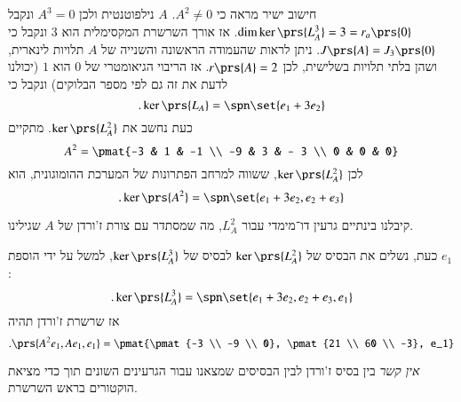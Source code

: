 \documentclass[a4paper,10pt,oneside,openany]{article}
\begin{document}
\begin{solution}
חישוב ישיר מראה כי
$A^2 \neq 0$.
$A$
נילפוטנטית ולכן
$A^3 = 0$
ונקבל
$\dim \ker \prs{L_A^3} = 3 = r_a\prs{0}$.
אז אורך השרשרת המקסימלית הוא
$3$
ונקבל כי
$J\prs{A} = J_3\prs{0}$.
ניתן לראות שהעמודה הראשונה והשנייה של
$A$
תלויות לינארית, ושהן בלתי תלויות בשלישית, לכן
$r\prs{A} = 2$.
אז הריבוי הגיאומטרי של
$0$
הוא
$1$
(יכולנו לדעת את זה גם לפי מספר הבלוקים) ונקבל כי
\[\text{.} \ker\prs{L_A} = \spn\set{e_1 + 3 e_2}\]
כעת נחשב את
$\ker\prs{L_A^2}$.
מתקיים
\[A^2 = \pmat{-3 & 1 & -1 \\ -9 & 3 & - 3 \\ 0 & 0 & 0}\]
לכן
$\ker\prs{L_A^2}$,
ששווה למרחב הפתרונות של המערכת ההומוגונית, הוא
\[\text{.} \ker\prs{A^2} = \spn\set{e_1 + 3 e_2, e_2 + e_3}\]

\begin{remark}
קיבלנו בינתיים גרעין דו־מימדי עבור
$L_A^2$,
מה שמסתדר עם צורת ז'ורדן של
$A$
שגילינו.
\end{remark}

כעת, נשלים את הבסיס של
$\ker\prs{L_A^2}$
לבסיס של
$\ker\prs{L_A^3}$,
למשל על ידי הוספת
$e_1$:
\[\text{.} \ker\prs{L_A^3} = \spn\set{e_1 + 3 e_2, e_2 + e_3, e_1}\]
אז שרשרת ז'ורדן תהיה
\[\text{.} \prs{A^2 e_1, A e_1, e_1} = \pmat{\pmat{-3 \\ -9 \\ 0}, \pmat{21 \\ 60 \\ -3}, e_1}\]

\begin{remark}
\emph{אין קשר}
בין בסיס ז'ורדן לבין הבסיסים שמצאנו עבור הגרעינים השונים תוך כדי מציאת הוקטורים בראש השרשרת.
\end{remark}
\end{solution}
\end{document}
